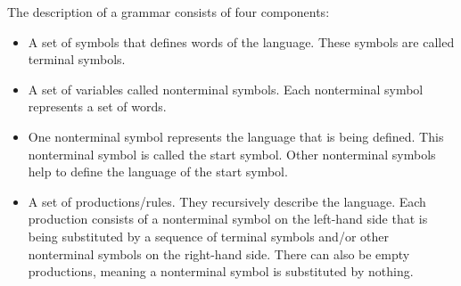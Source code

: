 The description of a grammar consists of four components:

\begin{itemize}

\item A set of symbols that defines words of the language. These symbols are called terminal symbols.

\item A set of variables called nonterminal symbols. Each nonterminal symbol represents a set of words. 

\item One nonterminal symbol represents the language that is being defined. This nonterminal symbol is called the start symbol. Other nonterminal symbols help to define the language of the start symbol.

\item A set of productions/rules. They recursively describe the language. Each production consists of a nonterminal symbol on the left-hand side that is being substituted by a sequence of terminal symbols and/or other nonterminal symbols on the right-hand side.
There can also be empty productions, meaning a nonterminal symbol is substituted by nothing.
\end{itemize}


\cite{AutomataTheory.2007}

%
%

